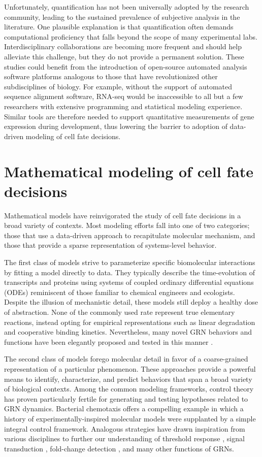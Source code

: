 Unfortunately, quantification has not been universally adopted by the research community, leading to the sustained prevalence of subjective analysis in the literature. One plausible explanation is that quantification often demands computational proficiency that falls beyond the scope of many experimental labs. Interdisciplinary collaborations are becoming more frequent and should help alleviate this challenge, but they do not provide a permanent solution. These studies could benefit from the introduction of open-source automated analysis software platforms analogous to those that have revolutionized other subdisciplines of biology. For example, without the support of automated sequence alignment software, RNA-seq would be inaccessible to all but a few researchers with extensive programming and statistical modeling experience. Similar tools are therefore needed to support quantitative measurements of gene expression during development, thus lowering the barrier to adoption of data-driven modeling of cell fate decisions.

\section{Mathematical modeling of cell fate decisions}

Mathematical models have reinvigorated the study of cell fate decisions in a broad variety of contexts. Most modeling efforts fall into one of two categories; those that use a data-driven approach to recapitulate molecular mechanism, and those that provide a sparse representation of systems-level behavior. 

The first class of models strive to parameterize specific biomolecular interactions by fitting a model directly to data. They typically describe the time-evolution of transcripts and proteins using systems of coupled ordinary differential equations (ODEs) reminiscent of those familiar to chemical engineers and ecologists. Despite the illusion of mechanistic detail, these models still deploy a healthy dose of abstraction. None of the commonly used rate represent true elementary reactions, instead opting for empirical representations such as linear degradation and cooperative binding kinetics. Nevertheless, many novel GRN behaviors and functions have been elegantly proposed and tested in this manner \cite{Yu2008,Paulsen2011}. 

The second class of models forego molecular detail in favor of a coarse-grained representation of a particular phenomenon. These approaches provide a powerful means to identify, characterize, and predict behaviors that span a broad variety of biological contexts. Among the common modeling frameworks, control theory has proven particularly fertile for generating and testing hypotheses related to GRN dynamics. Bacterial chemotaxis offers a compelling example in which a history of experimentally-inspired molecular models were supplanted by a simple integral control framework. Analogous strategies have drawn inspiration from various disciplines to further our understanding of threshold response \cite{Melen2005,Graham2010}, signal transduction \cite{Benziger2018}, fold-change detection \cite{Adler2018}, and many other functions of GRNs.

